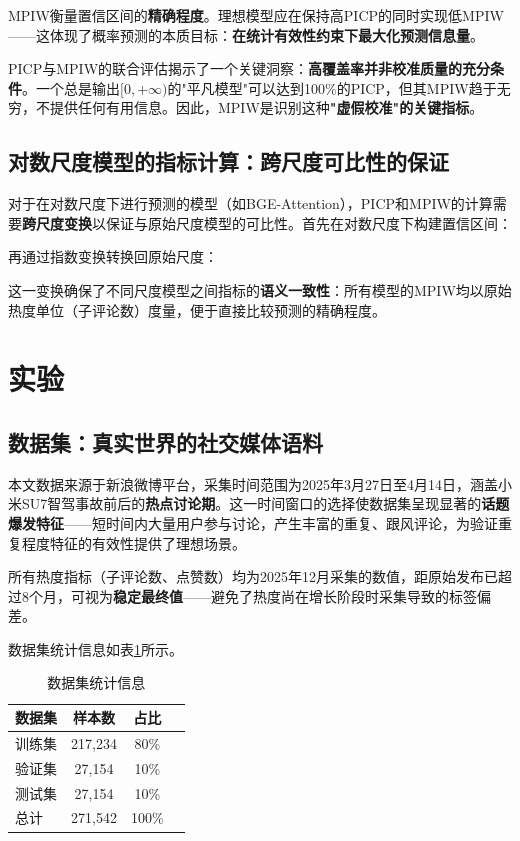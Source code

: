 \documentclass[10pt]{article}
\begin{document}
MPIW衡量置信区间的\textbf{精确程度}。理想模型应在保持高PICP的同时实现低MPIW——这体现了概率预测的本质目标：\textbf{在统计有效性约束下最大化预测信息量}。

PICP与MPIW的联合评估揭示了一个关键洞察：\textbf{高覆盖率并非校准质量的充分条件}。一个总是输出$[0, +\infty)$的"平凡模型"可以达到100\%的PICP，但其MPIW趋于无穷，不提供任何有用信息。因此，MPIW是识别这种\textbf{"虚假校准"的关键指标}。

\subsection{对数尺度模型的指标计算：跨尺度可比性的保证}

对于在对数尺度下进行预测的模型（如BGE-Attention），PICP和MPIW的计算需要\textbf{跨尺度变换}以保证与原始尺度模型的可比性。首先在对数尺度下构建置信区间：
\begin{equation}
[\log(\mu+c) - 1.96\sigma, \log(\mu+c) + 1.96\sigma]
\end{equation}

再通过指数变换转换回原始尺度：
\begin{equation}
[\exp(\text{Lower}_{\log}) - c, \exp(\text{Upper}_{\log}) - c]
\end{equation}

这一变换确保了不同尺度模型之间指标的\textbf{语义一致性}：所有模型的MPIW均以原始热度单位（子评论数）度量，便于直接比较预测的精确程度。

\section{实验}

\subsection{数据集：真实世界的社交媒体语料}

本文数据来源于新浪微博平台，采集时间范围为2025年3月27日至4月14日，涵盖小米SU7智驾事故前后的\textbf{热点讨论期}。这一时间窗口的选择使数据集呈现显著的\textbf{话题爆发特征}——短时间内大量用户参与讨论，产生丰富的重复、跟风评论，为验证重复程度特征的有效性提供了理想场景。

所有热度指标（子评论数、点赞数）均为2025年12月采集的数值，距原始发布已超过8个月，可视为\textbf{稳定最终值}——避免了热度尚在增长阶段时采集导致的标签偏差。

数据集统计信息如表\ref{tab:dataset}所示。

\begin{table}[H]
\centering
\caption{数据集统计信息}
\label{tab:dataset}
\begin{tabular}{lccc}
\toprule
\textbf{数据集} & \textbf{样本数} & \textbf{占比} \\
\midrule
训练集 & 217,234 & 80\% \\
验证集 & 27,154 & 10\% \\
测试集 & 27,154 & 10\% \\
\midrule
总计 & 271,542 & 100\% \\
\bottomrule
\end{tabular}
\end{table}
\end{document}
